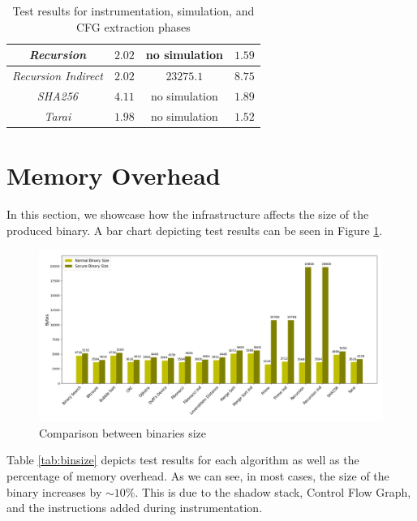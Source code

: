 \begin{table}
\begin{tabular}{|c|c|c|c|}
    \hline
    \textit{Recursion}                   & $2.02$                        & no simulation            & $1.59$                       \\
    \hline
    \textit{Recursion Indirect}          & $2.02$                        & $23275.1$                & $8.75$                       \\
    \hline
    \textit{SHA256}                      & $4.11$                        & no simulation            & $1.89$                       \\
    \hline
    \textit{Tarai}                       & $1.98$                        & no simulation            & $1.52$                       \\
    \hline
  \end{tabular}
  \caption{Test results for instrumentation, simulation, and CFG extraction
  phases}
  \label{tab:othertimes}
\end{table}

\section{Memory Overhead}
\label{sec:pa_memory}

In this section, we showcase how the infrastructure affects the size of the
produced binary. A bar chart depicting test results can be seen in Figure \ref{fig:binsize}.

\begin{figure}[htbp]
  \centering
  \includegraphics[width=\linewidth]{images/size.png}
  \caption{Comparison between binaries size}
  \label{fig:binsize}
\end{figure}

Table \ref{tab:binsize} depicts test results for each algorithm as well as the
percentage of memory overhead. As we can see, in most cases, the size of the binary
increases by $\sim 10\%$. This is due to the shadow stack, Control Flow Graph,
and the instructions added during instrumentation.

